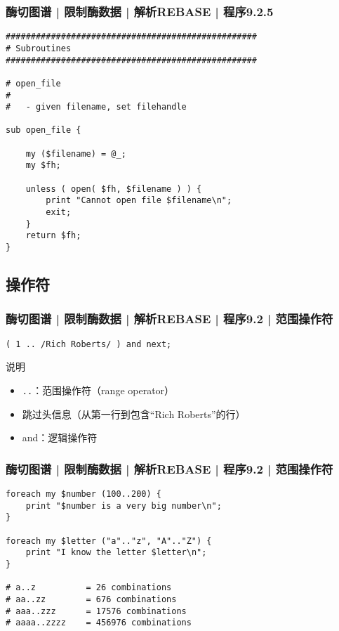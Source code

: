 \begin{frame}[fragile]
  \frametitle{酶切图谱 | 限制酶数据 | 解析REBASE | 程序9.2.5}
\begin{lstlisting}[firstnumber=57,basicstyle=\footnotesize\tt,numberstyle=\scriptsize]
##################################################
# Subroutines
##################################################

# open_file
#
#   - given filename, set filehandle

sub open_file {

    my ($filename) = @_;
    my $fh;

    unless ( open( $fh, $filename ) ) {
        print "Cannot open file $filename\n";
        exit;
    }
    return $fh;
}
\end{lstlisting}
\end{frame}

\subsection{操作符}
\begin{frame}[fragile]
  \frametitle{酶切图谱 | 限制酶数据 | 解析REBASE | 程序9.2 | \alert{范围操作符}}
\begin{lstlisting}
( 1 .. /Rich Roberts/ ) and next;
\end{lstlisting}
\pause
\begin{block}{说明}
  \begin{itemize}
    \item \verb|..|：范围操作符（range operator）
    \item 跳过头信息（从第一行到包含“Rich Roberts”的行）
    \item and：逻辑操作符
  \end{itemize}
\end{block}
\end{frame}

\begin{frame}[fragile]
  \frametitle{酶切图谱 | 限制酶数据 | 解析REBASE | 程序9.2 | \alert{范围操作符}}
\begin{lstlisting}
foreach my $number (100..200) {
    print "$number is a very big number\n";
}

foreach my $letter ("a".."z", "A".."Z") {
    print "I know the letter $letter\n";
}

# a..z          = 26 combinations
# aa..zz        = 676 combinations
# aaa..zzz      = 17576 combinations
# aaaa..zzzz    = 456976 combinations
\end{lstlisting}
\end{frame}

